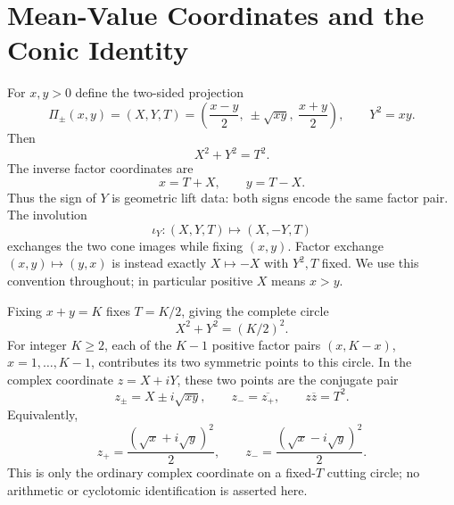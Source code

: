 \documentclass[11pt]{amsart}
\theoremstyle{remark}
\numberwithin{equation}{section}
\begin{document}
\section{Mean-Value Coordinates and the Conic Identity}
For $x,y>0$ define the two-sided projection
\begin{equation}
\Pi_\pm(x,y)=\left(X,Y,T\right)=\left(\frac{x-y}2,\ \pm\sqrt{xy},\ \frac{x+y}2\right),\qquad Y^2=xy. 
\end{equation}
Then
\begin{equation}
X^2+Y^2=T^2. 
\end{equation}
The inverse factor coordinates are
\begin{equation}
x=T+X,\qquad y=T-X. 
\end{equation}
Thus the sign of $Y$ is geometric lift data: both signs encode the same factor pair. The involution
\begin{equation}
\iota_Y:(X,Y,T)\longmapsto(X,-Y,T)
\end{equation}
exchanges the two cone images while fixing $(x,y)$. Factor exchange $(x,y)\mapsto(y,x)$ is instead exactly $X\mapsto-X$ with $Y^2,T$ fixed. We use this convention throughout; in particular positive $X$ means $x>y$.

Fixing $x+y=K$ fixes $T=K/2$, giving the complete circle
\begin{equation}
X^2+Y^2=(K/2)^2.
\end{equation}
For integer $K\ge2$, each of the $K-1$ positive factor pairs $(x,K-x)$, $x=1,\ldots,K-1$, contributes its two symmetric points to this circle. In the complex coordinate $z=X+iY$, these two points are the conjugate pair
\begin{equation}
z_\pm=X\pm i\sqrt{xy},\qquad z_-=\overline{z_+},\qquad z\overline z=T^2.
\end{equation}
Equivalently,
\begin{equation}
z_+=\frac{(\sqrt{x}+i\sqrt{y})^2}{2},\qquad z_-=\frac{(\sqrt{x}-i\sqrt{y})^2}{2}.
\end{equation}
This is only the ordinary complex coordinate on a fixed-$T$ cutting circle; no arithmetic or cyclotomic identification is asserted here.
\end{document}
